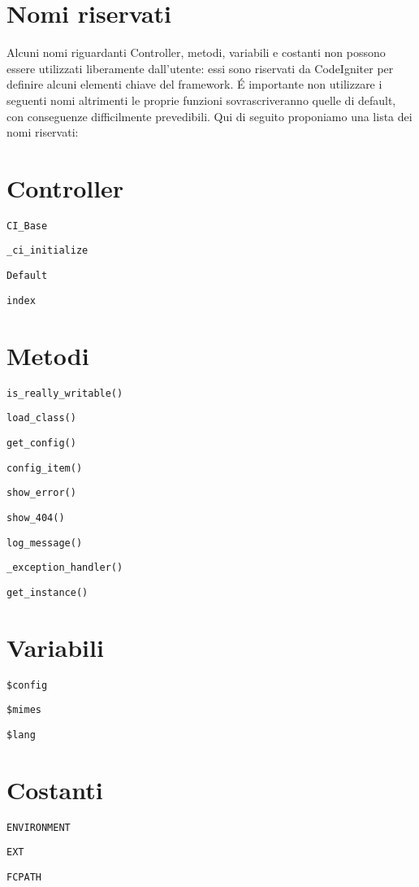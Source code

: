\section{Nomi riservati}
\label{cap:nomiriservati}
Alcuni nomi riguardanti Controller, metodi, variabili e costanti non possono essere utilizzati liberamente dall'utente: essi sono riservati da CodeIgniter per definire alcuni elementi chiave del framework. \'E importante non utilizzare i seguenti nomi altrimenti le proprie funzioni sovrascriveranno quelle di default, con conseguenze difficilmente prevedibili. Qui di seguito proponiamo una lista dei nomi riservati:

\section*{Controller}
\verb|CI_Base|

\verb|_ci_initialize|

\verb|Default|

\verb|index|

\section*{Metodi}
\verb|is_really_writable()|

\verb|load_class()|

\verb|get_config()|

\verb|config_item()|

\verb|show_error()|

\verb|show_404()|

\verb|log_message()|

\verb|_exception_handler()|

\verb|get_instance()|

\section*{Variabili}
\verb|$config|

\verb|$mimes|

\verb|$lang|

\section*{Costanti}
\verb|ENVIRONMENT|

\verb|EXT|

\verb|FCPATH|

